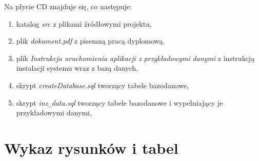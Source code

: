 \documentclass[a4paper,12pt,twoside]{article}
\begin{document}
Na płycie CD znajduje się, co następuje:
\begin{enumerate}[1)]
\item katalog \textit{src} z plikami źródłowymi projektu,
\item plik \textit{dokument.pdf} z pisemną pracą dyplomową,
\item plik \textit{Instrukcja uruchomienia aplikacji z przykładowymi danymi} z instrukcją instalacji systemu wraz z bazą danych,
\item skrypt \textit{createDatabase.sql} tworzący tabele bazodanowe,
\item skrypt \textit{inz}\verb!_!\textit{data.sql} tworzący tabele bazodanowe i wypełniający je przykładowymi danymi,
\end{enumerate}

\newpage
\section*{Wykaz rysunków i tabel}
\listoffigures
\listoftables
\end{document}
